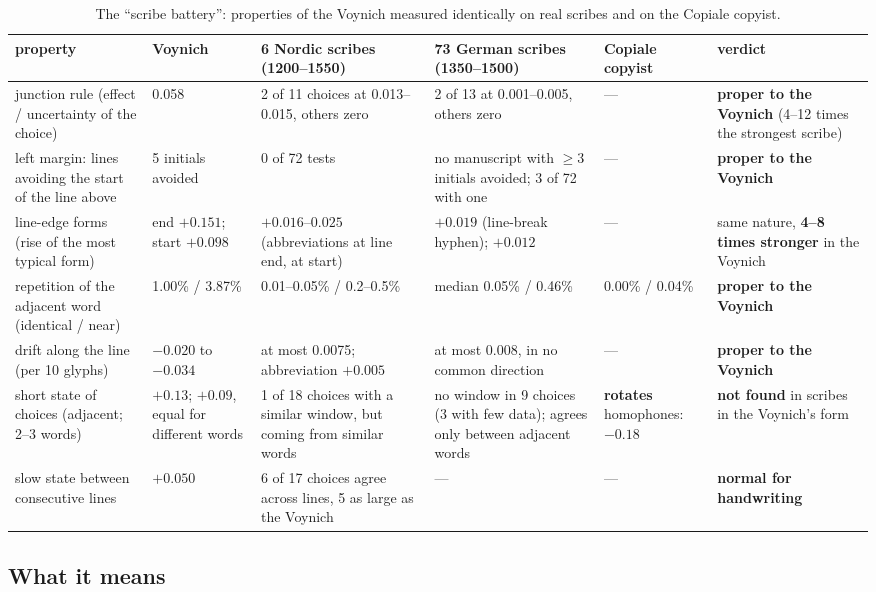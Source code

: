 \begin{table}[ht]
\centering\footnotesize
\caption{The ``scribe battery'': properties of the Voynich measured identically on real scribes and on the Copiale
copyist.}
\label{tab:battery}
\begin{tabularx}{\linewidth}{>{\raggedright\arraybackslash}p{2.9cm}YYYYY}
\toprule
property & Voynich & 6 Nordic scribes (1200--1550) & 73 German scribes (1350--1500) & Copiale copyist & verdict \\
\midrule
junction rule (effect / uncertainty of the choice) & 0.058 & 2 of 11 choices at 0.013--0.015, others zero & 2 of 13 at
0.001--0.005, others zero & --- & \textbf{proper to the Voynich} (4--12 times the strongest scribe) \\
left margin: lines avoiding the start of the line above & 5 initials avoided & 0 of 72 tests & no manuscript with
$\ge 3$ initials avoided; 3 of 72 with one & --- & \textbf{proper to the Voynich} \\
line-edge forms (rise of the most typical form) & end  $+0.151$; start  $+0.098$ & $+0.016$--$0.025$
(abbreviations at line end,  at start) & $+0.019$ (line-break hyphen); $+0.012$ & --- & same nature, \textbf{4--8
times stronger} in the Voynich \\
repetition of the adjacent word (identical / near) & 1.00\% / 3.87\% & 0.01--0.05\% / 0.2--0.5\% & median 0.05\% /
0.46\% & 0.00\% / 0.04\% & \textbf{proper to the Voynich} \\
drift along the line (per 10 glyphs) & $-0.020$ to $-0.034$ & at most 0.0075; abbreviation $+0.005$ & at most 0.008,
in no common direction & --- & \textbf{proper to the Voynich} \\
short state of choices (adjacent; 2--3 words) & $+0.13$; $+0.09$, equal for different words & 1 of 18 choices with a
similar window, but coming from similar words & no window in 9 choices (3 with few data);  agrees only between
adjacent words & \textbf{rotates} homophones: $-0.18$ & \textbf{not found} in
scribes in the Voynich's form \\
slow state between consecutive lines & $+0.050$ & 6 of 17 choices agree across lines, 5 as large as the Voynich & --- &
--- & \textbf{normal for handwriting} \\
\bottomrule
\end{tabularx}
\end{table}

\subsection{What it means}

